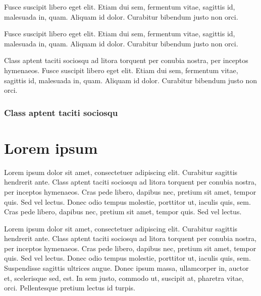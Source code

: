 \begin{note}
Fusce suscipit libero eget elit. Etiam dui sem, fermentum vitae, sagittis id, malesuada in, quam. Aliquam id dolor. Curabitur bibendum justo non orci.
\end{note}

\begin{remark}
Fusce suscipit libero eget elit. Etiam dui sem, fermentum vitae, sagittis id, malesuada in, quam. Aliquam id dolor. Curabitur bibendum justo non orci.
\end{remark}

\begin{lemma}
Class aptent taciti sociosqu ad litora torquent per conubia nostra, per inceptos hymenaeos. Fusce suscipit libero eget elit. Etiam dui sem, fermentum vitae, sagittis id, malesuada in, quam. Aliquam id dolor. Curabitur bibendum justo non orci.
\end{lemma}

\lipsum[1-2]

\subsection{Class aptent taciti sociosqu}

\lipsum[4-5]

\chapter{Lorem ipsum}

\begin{chapterabstract}
	Lorem ipsum dolor sit amet, consectetuer adipiscing elit. Curabitur sagittis hendrerit ante. Class aptent taciti sociosqu ad litora torquent per conubia nostra, per inceptos hymenaeos. Cras pede libero, dapibus nec, pretium sit amet, tempor quis. Sed vel lectus. Donec odio tempus molestie, porttitor ut, iaculis quis, sem. Cras pede libero, dapibus nec, pretium sit amet, tempor quis. Sed vel lectus. 
\end{chapterabstract}

Lorem ipsum dolor sit amet, consectetuer adipiscing elit. Curabitur sagittis hendrerit ante. Class aptent taciti sociosqu ad litora torquent per conubia nostra, per inceptos hymenaeos. Cras pede libero, dapibus nec, pretium sit amet, tempor quis. Sed vel lectus. Donec odio tempus molestie, porttitor ut, iaculis quis, sem. Suspendisse sagittis ultrices augue. Donec ipsum massa, ullamcorper in, auctor et, scelerisque sed, est. In sem justo, commodo ut, suscipit at, pharetra vitae, orci. Pellentesque pretium lectus id turpis. \cite{Kopka2004}

